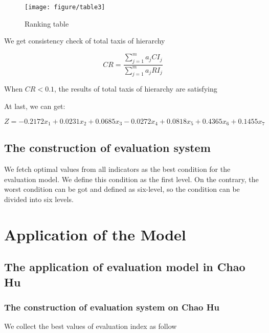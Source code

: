 \documentclass[12pt,a4paper]{article}
\begin{document}
\begin{itemize}
\begin{figure}[H]
    \centering
    \texttt{[image: figure/table3]}
    \caption{Ranking table}
\end{figure}

    We get consistency check of total taxis of hierarchy
    
    \begin{equation}
    CR=\displaystyle\frac{\sum\limits_{j=1}^{m}a_jCI_j}{\sum\limits_{j=1}^{m}a_jRI_j}
    \end{equation}
    
    When $CR < 0.1$, the results of total taxis of hierarchy are satisfying
\end{itemize}
At last, we can get:\par

\begin{equation}
Z=-0.2172x_1+0.0231x_2+0.0685x_3-0.0272x_4+0.0818x_5+0.4365x_6+0.1455x_7
\end{equation}\par

\subsection{The construction of evaluation system }
We fetch optimal values from all indicators as the best condition for the evaluation model. We define this condition as the first level. On the contrary, the worst condition can be got and defined as six-level, so the condition can be divided into six levels.

\section{Application of the Model}
\subsection{The application of evaluation model in Chao Hu}
\subsubsection{The construction of evaluation system on Chao Hu}
We collect the best values of evaluation index as follow
\end{document}
